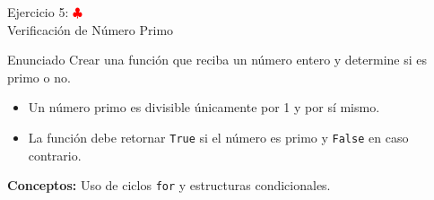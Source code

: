 \documentclass[10pt]{beamer}
\begin{document}
\begin{frame}{Ejercicio 5: \hfill \textcolor{red}{$\clubsuit$} \\ 
Verificación de Número Primo}
  \begin{block}{Enunciado}
    Crear una función que reciba un número entero y determine si es primo o no.
    \begin{itemize}
      \item Un número primo es divisible únicamente por 1 y por sí mismo.
      \item La función debe retornar \texttt{True} si el número es primo y \texttt{False} en caso contrario.
    \end{itemize}
  \end{block}
  \textbf{Conceptos:} Uso de ciclos \texttt{for} y estructuras condicionales.
\end{frame}
\end{document}
